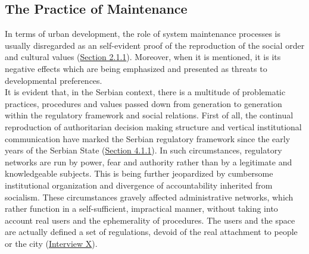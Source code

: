 \documentclass[11pt]{report}
\begin{document}
{\subsection{The Practice of Maintenance}

In terms of urban development, the role of system maintenance processes is usually disregarded as an self-evident proof of the reproduction of the social order and cultural values (\href{Section 2.1.1}{Section 2.1.1}). 
Moreover, when it is mentioned, it is its negative effects which are being emphasized and presented as threats to developmental preferences.
\\

It is evident that, in the Serbian context, there is a multitude of problematic practices, procedures and values passed down from generation to generation within the regulatory framework and social relations. 
First of all, the continual reproduction of authoritarian decision making structure and vertical institutional communication have marked the Serbian regulatory framework since the early years of the Serbian State (\href{Section 4.1.1}{Section 4.1.1}). 
In such circumstances, regulatory networks are run by power, fear and authority rather than by a legitimate and knowledgeable subjects.
This is being further jeopardized by cumbersome institutional organization and divergence of accountability inherited from socialism.
These circumstances gravely affected administrative networks, which rather function in a self-sufficient, impractical manner, without taking into account real users and the ephemerality of procedures.
The users and the space are actually defined a set of regulations, devoid of the real attachment to people or the city (\href{InterviewX}{Interview X}).
\\

}
\end{document}

